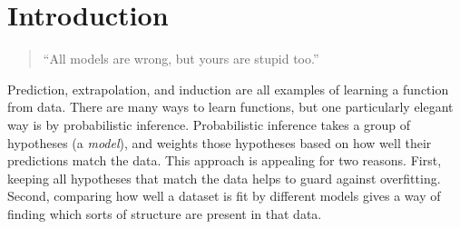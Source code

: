 
\inbpdocument

\chapter{Introduction}
\label{ch:intro}




\begin{quotation}
``All models are wrong, but yours are stupid too.'' \\
\hspace*{\fill} \citet{mlhipster}
\end{quotation}

Prediction, extrapolation, and induction are all examples of learning a function from data.
There are many ways to learn functions, but one particularly elegant way is by probabilistic inference.
Probabilistic inference takes a group of hypotheses (a \emph{model}), and weights those hypotheses based on how well their predictions match the data.
This approach is appealing for two reasons.
First, keeping all hypotheses that match the data helps to guard against overfitting.
Second, comparing how well a dataset is fit by different models gives a way of finding which sorts of structure are present in that data. %

